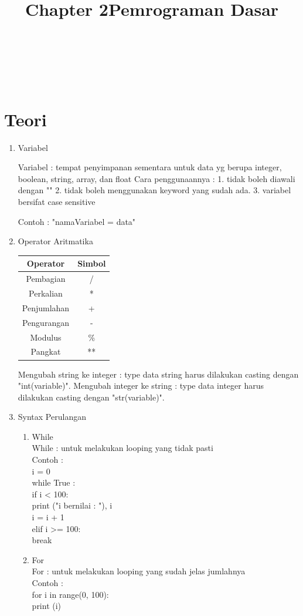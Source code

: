 \clearpage
\setcounter{page}{1}

\begin{center}
\title{\LARGE \bf Chapter 2}\\
\title{\LARGE \bf Pemrograman Dasar}\\
\end{center}

\appendix
\section{Teori}

\begin{enumerate}
\item Variabel

Variabel : tempat penyimpanan sementara untuk data yg berupa integer, boolean, string, array, dan float
Cara penggunaannya : 
1. tidak boleh diawali dengan "\textunderscore" 
2. tidak boleh menggunakan keyword yang sudah ada.
3. variabel bersifat case sensitive

Contoh :
"nama\textunderscore Variabel = data"

\item Operator Aritmatika\\
\begin{tabular}{|c|c|}
\hline
Operator & Simbol\\
\hline
Pembagian & /\\
\hline
Perkalian & *\\
\hline
Penjumlahan & +\\
\hline
Pengurangan & -\\
\hline
Modulus & \% \\
\hline
Pangkat & **\\
\hline
\end{tabular}

Mengubah string ke integer : type data string harus dilakukan casting dengan "int(variable)".
Mengubah integer ke string : type data integer harus dilakukan casting dengan "str(variable)".

\item Syntax Perulangan
\begin{enumerate}[label=\alph*.]
\item While\\ 
While : untuk melakukan looping yang tidak pasti\\
Contoh :\\
i = 0\\
while True :\\
    if i < 100:\\
        print ("i bernilai : "), i\\
        i = i + 1\\
    elif i >= 100:\\
        break\\
\item For\\
For : untuk melakukan looping yang sudah jelas jumlahnya\\
Contoh :\\
for i in range(0, 100):\\
    print (i)\\
\end{enumerate}


\end{enumerate}
